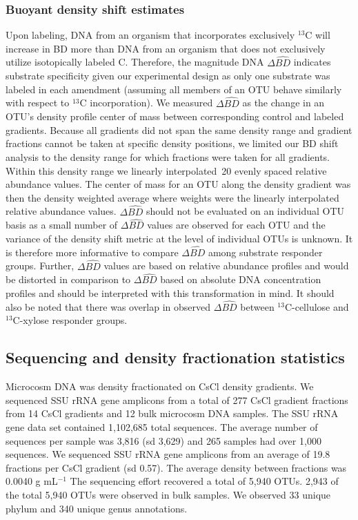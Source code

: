 \documentclass{article}
\begin{document}
\subsubsection{Buoyant density shift estimates}
Upon labeling, DNA from an organism that incorporates exclusively $^{13}$C will
increase in BD more than DNA from an organism that does not exclusively utilize
isotopically labeled C. Therefore, the magnitude DNA $\Delta\hat{BD}$ indicates
substrate specificity given our experimental design as only one substrate was
labeled in each amendment (assuming all members of an OTU behave similarly with
respect to $^{13}$C incorporation). We measured $\Delta\hat{BD}$ as the change in
an OTU's density profile center of mass between corresponding control and
labeled gradients. Because all gradients did not span the same density range
and gradient fractions cannot be taken at specific density positions, we
limited our BD shift analysis to the density range for which fractions were
taken for all gradients. Within this density range we linearly interpolated~20
evenly spaced relative abundance values. The center of mass for an OTU along
the density gradient was then the density weighted average where weights were
the linearly interpolated relative abundance values. $\Delta\hat{BD}$ should
not be evaluated on an individual OTU basis as a small number of
$\Delta\hat{BD}$ values are observed for each OTU and the variance of the
density shift metric at the level of individual OTUs is unknown. It is
therefore more informative to compare $\Delta\hat{BD}$ among substrate
responder groups. Further, $\Delta\hat{BD}$ values are based on relative
abundance profiles and would be distorted in comparison to $\Delta\hat{BD}$
based on absolute DNA concentration profiles and should be interpreted with
this transformation in mind. It should also be noted that there was overlap in
observed $\Delta\hat{BD}$ between $^{13}$C-cellulose and $^{13}$C-xylose
responder groups. 

\subsection{Sequencing and density fractionation statistics}\label{seq_stats}
Microcosm DNA was density fractionated on CsCl density gradients. We sequenced
SSU rRNA gene amplicons from a total of 277 CsCl gradient fractions from 14
CsCl gradients and 12 bulk microcosm DNA samples. The SSU rRNA gene data set
contained 1,102,685 total sequences. The average number of sequences per sample
was 3,816 (sd 3,629) and 265 samples had over 1,000 sequences. We sequenced SSU
rRNA gene amplicons from an average of 19.8 fractions per CsCl gradient (sd
0.57). The average density between fractions was  0.0040 g mL$^{-1}$ The
sequencing effort recovered a total of 5,940 OTUs. 2,943 of the total 5,940
OTUs were observed in bulk samples. We observed 33 unique phylum and 340 unique
genus annotations.
\end{document}
